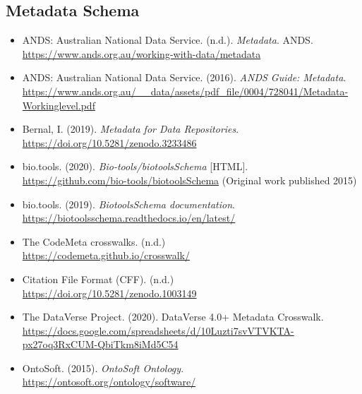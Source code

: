 \documentclass[11pt]{article}
\begin{document}
\vspace*{-2pt}
\subsection{Metadata Schema}
\label{metadata-schema}

\begin{itemize}

\item ANDS: Australian National Data Service. (n.d.). \emph{Metadata}. ANDS.\\
\url{https://www.ands.org.au/working-with-data/metadata}

\item ANDS: Australian National Data Service. (2016). \emph{ANDS Guide: Metadata}.\\
\url{https://www.ands.org.au/__data/assets/pdf_file/0004/728041/Metadata-Workinglevel.pdf}

\item Bernal, I. (2019). \emph{Metadata for Data Repositories}.\\
\url{https://doi.org/10.5281/zenodo.3233486}

\item bio.tools. (2020). \emph{Bio-tools/biotoolsSchema} {[}HTML{]}.\\
\url{https://github.com/bio-tools/biotoolsSchema}
(Original work published 2015)

\item bio.tools. (2019). \emph{BiotoolsSchema documentation}.\\
\url{https://biotoolsschema.readthedocs.io/en/latest/}

\item The CodeMeta crosswalks. (n.d.)\\
\url{https://codemeta.github.io/crosswalk/}

\item Citation File Format (CFF). (n.d.)\\
\url{https://doi.org/10.5281/zenodo.1003149}

\item The DataVerse Project. (2020). DataVerse 4.0+ Metadata Crosswalk.\\
\url{https://docs.google.com/spreadsheets/d/10Luzti7svVTVKTA-px27oq3RxCUM-QbiTkm8iMd5C54}

\item OntoSoft. (2015). \emph{OntoSoft Ontology}.\\
\url{https://ontosoft.org/ontology/software/}


\end{itemize}
\end{document}
